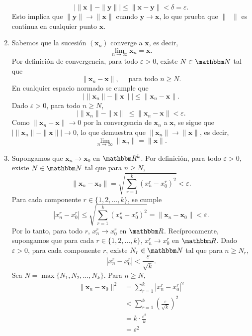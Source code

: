 \begin{enumerate}
    $$\big| \| \mathbf{x} \| - \| \mathbf{y} \| \big| \leq \| \mathbf{x} - \mathbf{y} \| < \delta = \varepsilon.$$
    Esto implica que $\| \mathbf{y} \| \to \| \mathbf{x} \|$ cuando $\mathbf{y} \to \mathbf{x}$, lo que prueba que $\| \phantom{x} \|$ es continua en cualquier punto $\mathbf{x}$.
    \item Sabemos que la sucesión $(\mathbf{x}_n)$ converge a $\mathbf{x}$, es decir,
    $$\lim_{n \to \infty} \mathbf{x}_n = \mathbf{x}.$$
    Por definición de convergencia, para todo $\varepsilon > 0$, existe $N \in \NN$ tal que
    $$\| \mathbf{x}_n - \mathbf{x} \|, \quad \text{ para todo } n \geq N.$$
    En cualquier espacio normado se cumple que
    $$\big| \| \mathbf{x}_n \| - \| \mathbf{x} \| \big| \leq \| \mathbf{x}_n - \mathbf{x} \|.$$
    Dado $\varepsilon > 0$, para todo $n \geq N$,
    $$\big| \| \mathbf{x}_n \| - \| \mathbf{x} \| \big| \leq \| \mathbf{x}_n - \mathbf{x} \| < \varepsilon.$$
    Como $\|\mathbf{x}_n - \mathbf{x}\| \to 0$ por la convergencia de $\mathbf{x}_n$ a $\mathbf{x}$, se sigue que $\big| \|\mathbf{x}_n\| - \|\mathbf{x}\| \big| \to 0$, lo que demuestra que $\|\mathbf{x}_n\| \to \|\mathbf{x}\|$, es decir,
    $$\lim_{n \to \infty} \|\mathbf{x}_n\| = \|\mathbf{x}\|.$$
    \item Supongamos que $\mathbf{x}_n \to \mathbf{x}_0$ en $\RR[k]$. Por definición, para todo $\varepsilon > 0$, existe $N \in \NN$ tal que para $n \geq N$,
    $$\|\mathbf{x}_n - \mathbf{x}_0\| = \sqrt{\sum_{r=1}^k \left(x_n^r - x_0^r\right)^2} < \varepsilon.$$
    Para cada componente $r \in \{1, 2, \dots, k\}$, se cumple
    $$\left|x_n^r - x_0^r\right| \leq \sqrt{\sum_{r=1}^k \left(x_n^r - x_0^r\right)^2} = \|\mathbf{x}_n - \mathbf{x}_0\| < \varepsilon.$$
    Por lo tanto, para todo $r$, $x_n^r \to x_0^r$ en $\RR$. Recíprocamente, supongamos que para cada $r \in \{1, 2, \dots, k\}$, $x_n^r \to x_0^r$ en $\RR$. Dado $\varepsilon > 0$, para cada componente $r$, existe $N_r \in \NN$ tal que para $n \geq N_r$,
    $$\left|x_n^r - x_0^r\right| < \frac{\varepsilon}{\sqrt{k}}.$$
    Sea $N = \max \{N_1, N_2, \dots, N_k\}$. Para $n \geq N$,
    \begin{align*}
        \|\mathbf{x}_n - \mathbf{x}_0\|^2 & = \sum_{r=1}^k \left|x_n^r - x_0^r\right|^2 \\
        & < \sum_{r=1}^k \left(\frac{\varepsilon}{\sqrt{k}}\right)^2 \\
        & = k \cdot \frac{\varepsilon^2}{k} \\
        & = \varepsilon^2
    \end{align*}

\end{enumerate}
